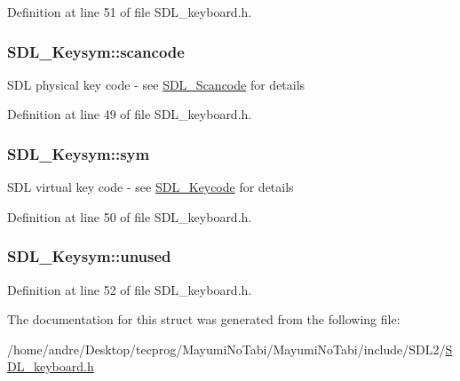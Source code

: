 Definition at line 51 of file S\-D\-L\-\_\-keyboard.\-h.

\hypertarget{struct_s_d_l___keysym_ad47e9120a511e2efc7ec0c6d8a5ec51e}{
\subsubsection[{scancode}]{ S\-D\-L\-\_\-\-Keysym\-::scancode}}\label{struct_s_d_l___keysym_ad47e9120a511e2efc7ec0c6d8a5ec51e}
S\-D\-L physical key code -\/ see \hyperlink{_s_d_l__scancode_8h_a82ab7cff701034fb40a47b5b3a02777b}{S\-D\-L\-\_\-\-Scancode} for details 

Definition at line 49 of file S\-D\-L\-\_\-keyboard.\-h.

\hypertarget{struct_s_d_l___keysym_a082ff1fd787b79fa6c3a445deb225f08}{
\subsubsection[{sym}]{ S\-D\-L\-\_\-\-Keysym\-::sym}}\label{struct_s_d_l___keysym_a082ff1fd787b79fa6c3a445deb225f08}
S\-D\-L virtual key code -\/ see \hyperlink{_s_d_l__keycode_8h_ae9265f064f13f0f74dfca26a67875171}{S\-D\-L\-\_\-\-Keycode} for details 

Definition at line 50 of file S\-D\-L\-\_\-keyboard.\-h.

\hypertarget{struct_s_d_l___keysym_ab1d0a50cc619966fb06b92e15cc46dd9}{
\subsubsection[{unused}]{ S\-D\-L\-\_\-\-Keysym\-::unused}}\label{struct_s_d_l___keysym_ab1d0a50cc619966fb06b92e15cc46dd9}


Definition at line 52 of file S\-D\-L\-\_\-keyboard.\-h.



The documentation for this struct was generated from the following file\-:\begin{DoxyCompactItemize}
\item 
/home/andre/\-Desktop/tecprog/\-Mayumi\-No\-Tabi/\-Mayumi\-No\-Tabi/include/\-S\-D\-L2/\hyperlink{_s_d_l__keyboard_8h}{S\-D\-L\-\_\-keyboard.\-h}\end{DoxyCompactItemize}
